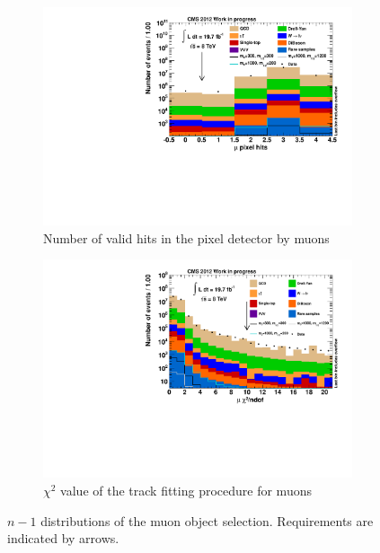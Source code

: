 \begin{figure}[!htb]
  \ContinuedFloat
  \centering
  \begin{subfigure}[b]{0.495\textwidth}
    \centering
    \includegraphics[width=\textwidth]{plots/nMuon_ValidPixelHitsCm.pdf}
    \caption{Number of valid hits in the pixel detector by muons\label{fig:muo_validpixelhits}}
  \end{subfigure}
  \begin{subfigure}[b]{0.495\textwidth}
    \centering
    \includegraphics[width=\textwidth]{plots/nMuon_TrkChi.pdf}
    \caption{$\chi^2$ value of the track fitting procedure for muons\label{fig:muo_chi2}}
  \end{subfigure}

  \caption{$n - 1$ distributions of the muon object selection. Requirements are indicated by arrows.}
  \label{fig:ntl}
\end{figure}



